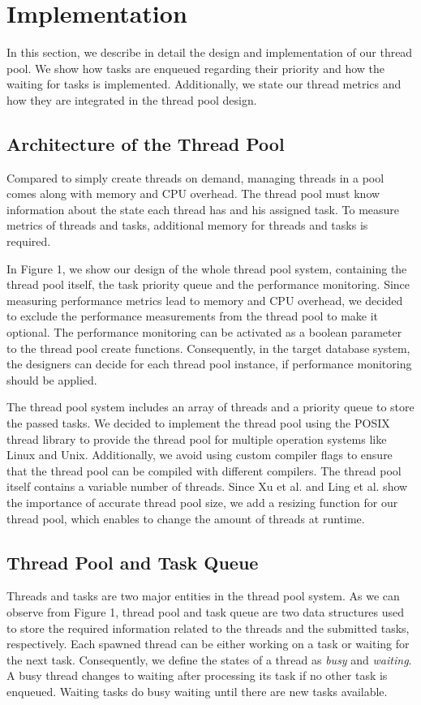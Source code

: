 \documentclass[conference]{IEEEtran}
\begin{document}
\section{Implementation}
In this section, we describe in detail the design and implementation of our thread pool. We show how tasks are enqueued regarding their priority and how the waiting for tasks is implemented. Additionally, we state our thread metrics and how they are integrated in the thread pool design. 

\subsection{Architecture of the Thread Pool}
Compared to simply create threads on demand, managing threads in a pool comes along with memory and CPU overhead. The thread pool must know information about the state each thread has and his assigned task. To measure metrics of threads and tasks, additional memory for threads and tasks is required. 

In Figure 1, we show our design of the whole thread pool system, containing the thread pool itself, the task priority queue and the performance monitoring. Since measuring performance metrics lead to memory and CPU overhead, we decided to exclude the performance measurements from the thread pool to make it optional. The performance monitoring can be activated as a boolean parameter to the thread pool create functions. Consequently, in the target database system, the designers can decide for each thread pool instance, if performance monitoring should be applied. 

The thread pool system includes an array of threads and a priority queue to store the passed tasks. We decided to implement the thread pool using the POSIX thread library to provide the thread pool for multiple operation systems like Linux and Unix. Additionally, we avoid using custom compiler flags to ensure that the thread pool can be compiled with different compilers. The thread pool itself contains a variable number of threads. Since Xu et al. \cite{xu2004performance} and Ling et al. \cite{ling2000analysis} show the importance of accurate thread pool size, we add a resizing function for our thread pool, which enables to change the amount of threads at runtime.

\subsection{Thread Pool and Task Queue}
Threads and tasks are two major entities in the thread pool system. As we can observe from Figure 1, thread pool and task queue are two data structures used to store the required information related to the threads and the submitted tasks, respectively. Each spawned thread can be either working on a task or waiting for the next task. Consequently, we define the states of a thread as \emph{busy} and \emph{waiting}. A busy thread changes to waiting after processing its task if no other task is enqueued. Waiting tasks do busy waiting until there are new tasks available.
\end{document}
